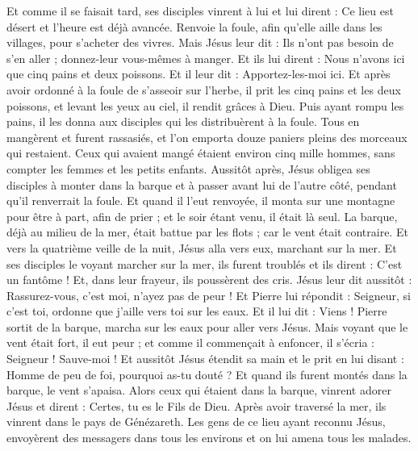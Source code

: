 \begin{multicols}{2}
Et comme il se faisait tard, ses disciples vinrent à lui et lui dirent : Ce lieu est désert et l'heure est déjà avancée. Renvoie la foule, afin qu'elle aille dans les villages, pour s'acheter des vivres.
Mais Jésus leur dit : Ils n'ont pas besoin de s'en aller ; donnez-leur vous-mêmes à manger.
Et ils lui dirent : Nous n'avons ici que cinq pains et deux poissons.
Et il leur dit : Apportez-les-moi ici.
Et après avoir ordonné à la foule de s'asseoir sur l'herbe, il prit les cinq pains et les deux poissons, et levant les yeux au ciel, il rendit grâces à Dieu. Puis ayant rompu les pains, il les donna aux disciples qui les distribuèrent à la foule.
Tous en mangèrent et furent rassasiés, et l'on emporta douze paniers pleins des morceaux qui restaient.
Ceux qui avaient mangé étaient environ cinq mille hommes, sans compter les femmes et les petits enfants.
Aussitôt après, Jésus obligea ses disciples à monter dans la barque et à passer avant lui de l'autre côté, pendant qu'il renverrait la foule.
Et quand il l'eut renvoyée, il monta sur une montagne pour être à part, afin de prier ; et le soir étant venu, il était là seul.
La barque, déjà au milieu de la mer, était battue par les flots ; car le vent était contraire.
Et vers la quatrième veille de la nuit, Jésus alla vers eux, marchant sur la mer.
Et ses disciples le voyant marcher sur la mer, ils furent troublés et ils dirent : C'est un fantôme ! Et, dans leur frayeur, ils poussèrent des cris.
Jésus leur dit aussitôt : Rassurez-vous, c'est moi, n'ayez pas de peur !
Et Pierre lui répondit : Seigneur, si c'est toi, ordonne que j'aille vers toi sur les eaux.
Et il lui dit : Viens ! Pierre sortit de la barque, marcha sur les eaux pour aller vers Jésus.
Mais voyant que le vent était fort, il eut peur ; et comme il commençait à enfoncer, il s'écria : Seigneur ! Sauve-moi !
Et aussitôt Jésus étendit sa main et le prit en lui disant : Homme de peu de foi, pourquoi as-tu douté ?
Et quand ils furent montés dans la barque, le vent s'apaisa.
Alors ceux qui étaient dans la barque, vinrent adorer Jésus et dirent : Certes, tu es le Fils de Dieu.
Après avoir traversé la mer, ils vinrent dans le pays de Génézareth.
Les gens de ce lieu ayant reconnu Jésus, envoyèrent des messagers dans tous les environs et on lui amena tous les malades.

\end{multicols}
